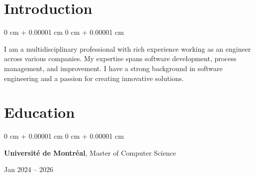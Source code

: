 \documentclass[10pt, letterpaper]{article}
\newenvironment{highlights}{
    \begin{itemize}[
        topsep=0.10 cm,
        parsep=0.10 cm,
        partopsep=0pt,
        itemsep=0pt,
        leftmargin=0 cm + 10pt
    ]
}{
    \end{itemize}
} %
\newenvironment{highlightsforbulletentries}{
    \begin{itemize}[
        topsep=0.10 cm,
        parsep=0.10 cm,
        partopsep=0pt,
        itemsep=0pt,
        leftmargin=10pt
    ]
}{
    \end{itemize}
} %
\newenvironment{onecolentry}{
    \begin{adjustwidth}{
        0 cm + 0.00001 cm
    }{
        0 cm + 0.00001 cm
    }
}{
    \end{adjustwidth}
} %
\newenvironment{twocolentry}[2][]{
    \onecolentry
    \def\secondColumn{#2}
    \setcolumnwidth{\fill, 6.5 cm}
    \begin{paracol}{2}
}{
    \switchcolumn \raggedleft \secondColumn
    \end{paracol}
    \endonecolentry
} %
\begin{document}







    \section{Introduction}
        \begin{onecolentry}
            I am a multidisciplinary professional with rich experience working as an engineer across various companies. My expertise spans software development, process management, and improvement. I have a strong background in software engineering and a passion for creating innovative solutions.
        \end{onecolentry}


    \section{Education} 
        \begin{twocolentry}{
            Jan 2024 – 2026
        }
            \textbf{Université de Montréal}, Master of Computer Science
        \end{twocolentry}

\end{document}
